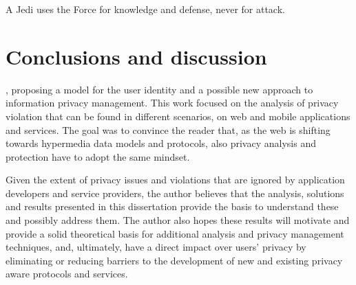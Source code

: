 \begin{savequote}[75mm] 
A Jedi uses the Force for knowledge and defense, never for attack.
\end{savequote}

\chapter{Conclusions and discussion}

, proposing a model for the user identity and a possible new approach to information privacy management. This work focused on the analysis of privacy violation that can be found in different scenarios, on web and mobile applications and services.
The goal was to convince the reader that, as the web is shifting towards hypermedia data models and protocols, also privacy analysis and protection have to adopt the same mindset.

Given the extent of privacy issues and violations that are ignored by application developers and service providers, the author believes that the analysis, solutions and results presented in this dissertation provide the basis to understand these and possibly address them.
The author also hopes these results will motivate and provide a solid theoretical basis for additional analysis and privacy management techniques, and, ultimately, have a direct impact over users' privacy by eliminating or reducing barriers to the development of new and existing privacy aware protocols and services.
